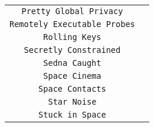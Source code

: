\documentclass[10pt]{article}
\begin{document}
\begin{center}
\begin{tabular}{| c | c |}
\multirow{2}{*}{{\tt Pretty Global Privacy}} &\\&\\\hline
\multirow{2}{*}{{\tt Remotely Executable Probes}} &\\&\\\hline
\multirow{2}{*}{{\tt Rolling Keys}} &\\&\\\hline
\multirow{2}{*}{{\tt Secretly Constrained}} &\\&\\\hline
\multirow{2}{*}{{\tt Sedna Caught}} &\\&\\\hline
\multirow{2}{*}{{\tt Space Cinema}} &\\&\\\hline
\multirow{2}{*}{{\tt Space Contacts}} &\\&\\\hline
\multirow{2}{*}{{\tt Star Noise}} &\\&\\\hline
\multirow{2}{*}{{\tt Stuck in Space}} &\\&\\\hline
\end{tabular}
\end{center}
\end{document}
